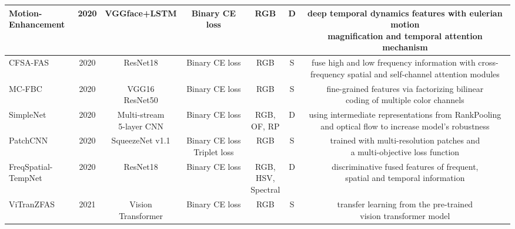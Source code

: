\documentclass[10pt,journal,compsoc]{IEEEtran}
\begin{document}
\begin{table}
{\begin{tabular}{l c c c c c c}
   \midrule
\tabincell{c}{Motion-\\Enhancement}~\cite{ge2020face} & 2020 & VGGface+LSTM  & Binary CE loss & RGB & D & \tabincell{c}{deep temporal dynamics features with eulerian motion\\
magnification and temporal attention mechanism}  \\  
 
   \midrule
CFSA-FAS~\cite{chen2020face} & 2020 & ResNet18  & Binary CE loss & RGB & S & \tabincell{c}{fuse high and low frequency information with cross-\\frequency spatial and self-channel attention modules}  \\   
 
  
 
   \midrule
MC-FBC~\cite{jia20203d} & 2020 & \tabincell{c}{VGG16\\ResNet50}  & Binary CE loss & RGB & S & \tabincell{c}{fine-grained features via factorizing bilinear\\ coding of multiple color channels}  \\   
 

   \midrule
SimpleNet~\cite{parkin2020creating} & 2020 & \tabincell{c}{Multi-stream \\5-layer CNN}  & Binary CE loss & \tabincell{c}{RGB, \\OF, RP} & D & \tabincell{c}{using intermediate representations from RankPooling\\ and optical flow to increase model's robustness}  \\   


   \midrule
PatchCNN~\cite{almeida2020detecting} & 2020 & SqueezeNet v1.1  & \tabincell{c}{Binary CE loss\\Triplet loss} & RGB & S & \tabincell{c}{trained with multi-resolution patches and \\a multi-objective loss function}  \\ 

   \midrule
\tabincell{c}{FreqSpatial-\\TempNet}~\cite{huang2020deep} & 2020 & ResNet18  & Binary CE loss & \tabincell{c}{RGB,\\HSV,\\Spectral} & D & \tabincell{c}{discriminative fused features of  frequent, \\spatial and temporal information}  \\ 


   \midrule
ViTranZFAS~\cite{george2020effectiveness} & 2021 & \tabincell{c}{Vision\\ Transformer}  & Binary CE loss & RGB & S & \tabincell{c}{transfer learning from the pre-trained \\vision transformer model }  \\  


\end{tabular}}
\end{table}
\end{document}
